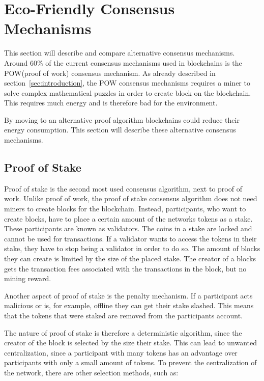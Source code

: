 

\section{Eco-Friendly Consensus Mechanisms}\label{sec:eco-friendly-consensus-mechanisms}
This section will describe and compare alternative consensus mechanisms.
Around 60\% of the current consensus mechanisms used in blockchains is the POW(proof of work) consensus mechanism.
As already described in section\ \ref{sec:introduction}, the POW consensus mechanisms requires a miner to solve complex mathematical puzzles in order to create block on the blockchain.
This requires much energy and is therefore bad for the environment.\cite{overview-of-sustainablity-blockchains,moralis-pow-enery-consumption}

By moving to an alternative proof algorithm blockchains could reduce their energy consumption.
This section will describe these alternative consensus mechanisms.\cite{4-ways-to-counter-blockchains-energy-consumption}

\subsection{Proof of Stake}\label{subsec:proof-of-stake}
Proof of stake is the second most used consensus algorithm, next to proof of work.
Unlike proof of work, the proof of stake consensus algorithm does not need miners to create blocks for the blockchain.
Instead, participants, who want to create blocks, have to place a certain amount of the networks tokens as a stake.
These participants are known as validators.
The coins in a stake are locked and cannot be used for transactions.
If a validator wants to access the tokens in their stake, they have to stop being a validator in order to do so.
The amount of blocks they can create is limited by the size of the placed stake.
The creator of a blocks gets the transaction fees associated with the transactions in the block, but no mining reward.\cite{bitpanda-pos}

Another aspect of proof of stake is the penalty mechanism.
If a participant acts malicious or is, for example, offline they can get their stake slashed.
This means that the tokens that were staked are removed from the participants account.\cite{bitpanda-pos}

The nature of proof of stake is therefore a deterministic algorithm, since the creator of the block is selected by the size their stake.
This can lead to unwanted centralization, since a participant with many tokens has an advantage over participants with only a small amount of tokens.
To prevent the centralization of the network, there are other selection methods, such as:

